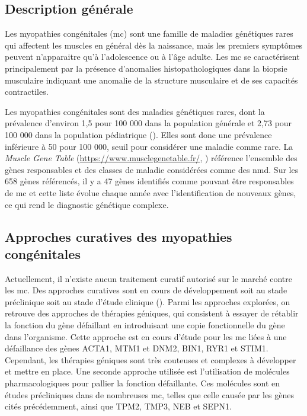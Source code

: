 \subsection{Description générale}
Les myopathies congénitales (\gls{mc}) sont une famille de maladies génétiques rares qui affectent les muscles en général dès la naissance, mais les premiers symptômes peuvent n'apparaitre qu'à l'adolescence ou à l'âge adulte. Les \gls{mc} se caractérisent principalement par la présence d'anomalies histopathologiques dans la biopsie musculaire indiquant une anomalie de la structure musculaire et de ses capacités contractiles.

Les myopathies congénitales sont des maladies génétiques rares, dont la prévalence d'environ 1,5 pour 100 000 dans la population générale et 2,73 pour 100 000 dans la population pédiatrique (\cite{huang_systematic_2021}). Elles sont donc une prévalence inférieure à 50 pour 100 000, seuil pour considérer une maladie comme rare. La \textit{Muscle Gene Table} (\url{https://www.musclegenetable.fr/}, \cite{benarroch_2023_2023}) référence l'ensemble des gènes responsables et des classes de maladie considérées comme des \gls{nmd}. Sur les 658 gènes référencés, il y a 47 gènes identifiés comme pouvant être responsables de \gls{mc} et cette liste évolue chaque année avec l'identification de nouveaux gènes, ce qui rend le diagnostic génétique complexe. 

\subsection{Approches curatives des myopathies congénitales}
Actuellement, il n'existe aucun traitement curatif autorisé sur le marché contre les \gls{mc}. Des approches curatives sont en cours de développement soit au stade préclinique soit au stade d'étude clinique (\cite{gineste_therapeutic_2023, guan_gene_2016}). Parmi les approches explorées, on retrouve des approches de thérapies géniques, qui consistent à essayer de rétablir la fonction du gène défaillant en introduisant une copie fonctionnelle du gène dans l'organisme. Cette approche est en cours d'étude pour les \gls{mc} liées à une défaillance des gènes ACTA1, MTM1 et DNM2, BIN1, RYR1 et STIM1. Cependant, les thérapies géniques sont très couteuses et complexes à développer et mettre en place. Une seconde approche utilisée est l'utilisation de molécules pharmacologiques pour pallier la fonction défaillante. Ces molécules sont en études précliniques dans de nombreuses \gls{mc}, telles que celle causée par les gènes cités précédemment, ainsi que TPM2, TMP3, NEB et SEPN1. 

